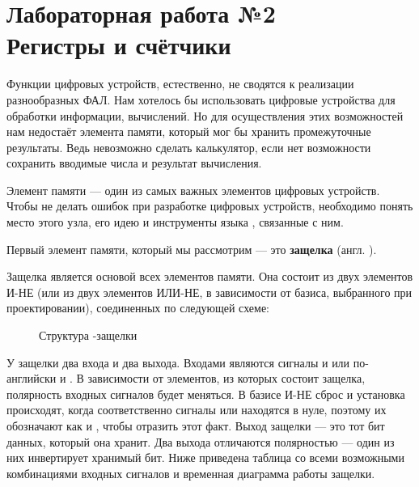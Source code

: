 \chapter{Лабораторная работа №2\\Регистры и счётчики} 

\par{Функции цифровых устройств, естественно, не сводятся к реализации разнообразных ФАЛ. Нам хотелось бы использовать цифровые устройства для обработки информации, вычислений. Но для осуществления этих возможностей нам недостаёт элемента памяти, который мог бы хранить промежуточные результаты. Ведь невозможно сделать калькулятор, если нет возможности сохранить вводимые числа и результат вычисления.}

\par{Элемент памяти — один из самых важных элементов цифровых устройств. Чтобы не делать ошибок при разработке цифровых устройств, необходимо понять место этого узла, его идею и инструменты языка , связанные с ним.}

\par{Первый элемент памяти, который мы рассмотрим — это  \textbf{защелка} (англ. ).}

\par{Защелка является основой всех элементов памяти. Она состоит из двух элементов И-НЕ (или из двух элементов ИЛИ-НЕ, в зависимости от базиса, выбранного при проектировании), соединенных по следующей схеме:}

\begin{figure}[H]
	\centering
	\def\svgwidth{\columnwidth}
	
	\caption{Структура -защелки}
\end{figure}

\par{У защелки два входа и два выхода. Входами являются сигналы  и  или по-английски  и . В зависимости от элементов, из которых состоит защелка, полярность входных сигналов будет меняться. В базисе И-НЕ сброс и установка происходят, когда соответственно сигналы  или  находятся в нуле, поэтому их обозначают как  и , чтобы отразить этот факт. Выход защелки — это тот бит данных, который она хранит. Два выхода отличаются полярностью — один из них инвертирует хранимый бит. Ниже приведена таблица со всеми возможными комбинациями входных сигналов и временная диаграмма работы защелки.}

